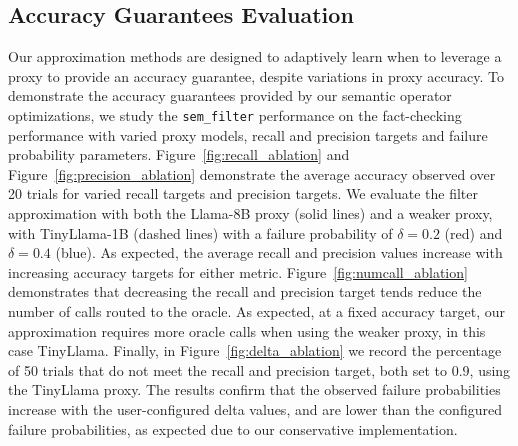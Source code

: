 \subsection{Accuracy Guarantees Evaluation}
\label{subsec:ablation}
Our approximation methods are designed to adaptively learn when to leverage a proxy to provide an accuracy guarantee, despite variations in proxy accuracy. To demonstrate the accuracy guarantees provided by our semantic operator optimizations, we study the \verb|sem_filter| performance on the fact-checking performance with varied proxy models, recall and precision targets and failure probability parameters. Figure~\ref{fig:recall_ablation} and Figure~\ref{fig:precision_ablation} demonstrate the average accuracy observed over 20 trials for varied recall targets and precision targets. We evaluate the filter approximation with both the Llama-8B proxy (solid lines) and a weaker proxy, with TinyLlama-1B (dashed lines) with a failure probability of $\delta=0.2$ (red) and $\delta=0.4$ (blue). As expected, the average recall and precision values increase with increasing accuracy targets for either metric. Figure~\ref{fig:numcall_ablation} demonstrates that decreasing the recall and precision target tends reduce the number of calls routed to the oracle. As expected, at a fixed accuracy target, our approximation requires more oracle calls when using the weaker proxy, in this case TinyLlama. Finally, in Figure~\ref{fig:delta_ablation} we record the percentage of 50 trials that do not meet the recall and precision target, both set to 0.9, using the TinyLlama proxy. The results confirm that the observed failure probabilities increase with the user-configured delta values, and are lower than the configured failure probabilities, as expected due to our conservative implementation.

